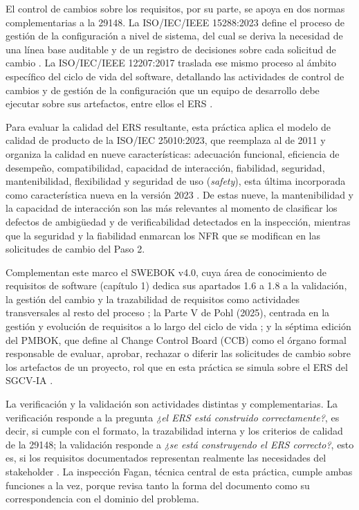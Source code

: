 \documentclass[11pt,a4paper]{article}
\newcommand{\subseccion}[1]{%
  \vspace{0.35cm}
  \noindent{\color{uteqverde}\textbf{\large #1}}\par
  \vspace{0.15cm}
}
\begin{document}
El control de cambios sobre los requisitos, por su parte, se apoya en dos normas
complementarias a la 29148. La ISO/IEC/IEEE 15288:2023 define el proceso de gestión
de la configuración a nivel de sistema, del cual se deriva la necesidad de una
línea base auditable y de un registro de decisiones sobre cada solicitud de cambio
\cite{ieee15288}. La ISO/IEC/IEEE 12207:2017 traslada ese mismo proceso al ámbito
específico del ciclo de vida del software, detallando las actividades de control de
cambios y de gestión de la configuración que un equipo de desarrollo debe ejecutar
sobre sus artefactos, entre ellos el ERS \cite{ieee12207}.

Para evaluar la calidad del ERS resultante, esta práctica aplica el modelo de
calidad de producto de la ISO/IEC 25010:2023, que reemplaza al de 2011 y organiza
la calidad en nueve características: adecuación funcional, eficiencia de
desempeño, compatibilidad, capacidad de interacción, fiabilidad, seguridad,
mantenibilidad, flexibilidad y seguridad de uso (\textit{safety}), esta última
incorporada como característica nueva en la versión 2023 \cite{iso25010}. De estas
nueve, la mantenibilidad y la capacidad de interacción son las más relevantes al
momento de clasificar los defectos de ambigüedad y de verificabilidad detectados
en la inspección, mientras que la seguridad y la fiabilidad enmarcan los NFR que
se modifican en las solicitudes de cambio del Paso 2.

Complementan este marco el SWEBOK v4.0, cuya área de conocimiento de requisitos de
software (capítulo 1) dedica sus apartados 1.6 a 1.8 a la validación, la gestión
del cambio y la trazabilidad de requisitos como actividades transversales al resto
del proceso \cite{swebok2024}; la Parte V de Pohl (2025), centrada en la gestión y
evolución de requisitos a lo largo del ciclo de vida \cite{pohl2025}; y la
séptima edición del PMBOK, que define al Change Control Board (CCB) como el
órgano formal responsable de evaluar, aprobar, rechazar o diferir las solicitudes
de cambio sobre los artefactos de un proyecto, rol que en esta práctica se simula
sobre el ERS del SGCV-IA \cite{pmbok2021}.

\subseccion{3.2 Validación de requisitos}

La verificación y la validación son actividades distintas y complementarias.
La verificación responde a la pregunta \textit{¿el ERS está construido
correctamente?}, es decir, si cumple con el formato, la trazabilidad interna y los
criterios de calidad de la 29148; la validación responde a \textit{¿se está
construyendo el ERS correcto?}, esto es, si los requisitos documentados
representan realmente las necesidades del stakeholder \cite{ieee29148}. La
inspección Fagan, técnica central de esta práctica, cumple ambas funciones a la
vez, porque revisa tanto la forma del documento como su correspondencia con el
dominio del problema.
\end{document}
